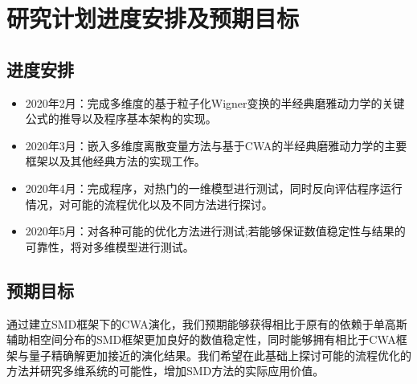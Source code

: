 \section{研究计划进度安排及预期目标}

\subsection{进度安排}
\begin{itemize}
	\item 2020年2月：完成多维度的基于粒子化Wigner变换的半经典磨雅动力学的关键公式的推导以及程序基本架构的实现。
	\item 2020年3月：嵌入多维度离散变量方法与基于CWA的半经典磨雅动力学的主要框架以及其他经典方法的实现工作。
	\item 2020年4月：完成程序，对热门的一维模型进行测试，同时反向评估程序运行情况，对可能的流程优化以及不同方法进行探讨。
	\item 2020年5月：对各种可能的优化方法进行测试;若能够保证数值稳定性与结果的可靠性，将对多维模型进行测试。
\end{itemize}


\subsection{预期目标}
通过建立SMD框架下的CWA演化，我们预期能够获得相比于原有的依赖于单高斯辅助相空间分布的SMD框架更加良好的数值稳定性，同时能够拥有相比于CWA框架与量子精确解更加接近的演化结果。我们希望在此基础上探讨可能的流程优化的方法并研究多维系统的可能性，增加SMD方法的实际应用价值。